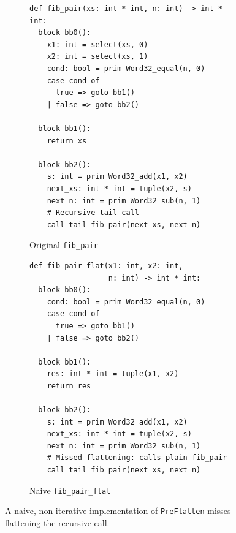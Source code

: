 \begin{figure}[htbp]
  \centering
  \begin{subfigure}[t]{0.48\textwidth}
    \caption{Original \texttt{fib\_pair}}
    \label{fig:bad_flat_rec_func_orig}
    \vspace{1mm}
\begin{verbatim}
def fib_pair(xs: int * int, n: int) -> int * int:
  block bb0():
    x1: int = select(xs, 0)
    x2: int = select(xs, 1)
    cond: bool = prim Word32_equal(n, 0)
    case cond of
      true => goto bb1()
    | false => goto bb2()

  block bb1():
    return xs

  block bb2():
    s: int = prim Word32_add(x1, x2)
    next_xs: int * int = tuple(x2, s)
    next_n: int = prim Word32_sub(n, 1)
    # Recursive tail call
    call tail fib_pair(next_xs, next_n)
\end{verbatim}
  \end{subfigure}\hfill
  \begin{subfigure}[t]{0.48\textwidth}
    \caption{Naive \texttt{fib\_pair\_flat}}
    \label{fig:bad_flat_rec_func_flat}
    \vspace{1mm}
\begin{verbatim}
def fib_pair_flat(x1: int, x2: int,
                  n: int) -> int * int:
  block bb0():
    cond: bool = prim Word32_equal(n, 0)
    case cond of
      true => goto bb1()
    | false => goto bb2()

  block bb1():
    res: int * int = tuple(x1, x2)
    return res

  block bb2():
    s: int = prim Word32_add(x1, x2)
    next_xs: int * int = tuple(x2, s)
    next_n: int = prim Word32_sub(n, 1)
    # Missed flattening: calls plain fib_pair
    call tail fib_pair(next_xs, next_n)
\end{verbatim}
  \end{subfigure}
  \caption{A naive, non-iterative implementation of \texttt{PreFlatten}
  misses flattening the recursive call.}
  \label{fig:bad_flat_rec_func_ssa}
\end{figure}

